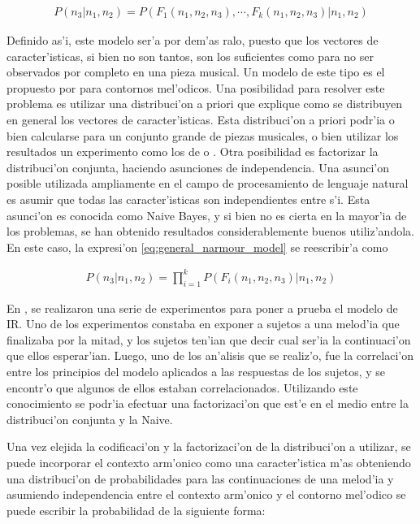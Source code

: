 \begin{align}
\label{eq:general_narmour_model}
P(n_3 | n_1, n_2) = P(F_1(n_1, n_2, n_3), \cdots, F_k(n_1, n_2, n_3)|n_1, n_2)
\end{align}

Definido as'i, este modelo ser'a por dem'as ralo, puesto que los vectores de caracter'isticas, si bien no son tantos, son los suficientes como para no ser observados
por completo en una pieza musical. Un modelo de este tipo es el propuesto por \cite{PaieThesis} para contornos mel'odicos. Una posibilidad para resolver este problema es utilizar una distribuci'on a priori que explique como se distribuyen en general
los vectores de caracter'isticas. Esta distribuci'on a priori podr'ia o bien calcularse para un conjunto grande de piezas musicales, o bien utilizar los resultados 
un experimento como los de \cite{Krumhansl95} o \cite{Schellenberg96}. 
Otra posibilidad es factorizar la distribuci'on conjunta, haciendo asunciones de independencia. Una asunci'on posible utilizada ampliamente en el campo 
de procesamiento de lenguaje natural es asumir que todas las caracter'isticas son independientes entre s'i. Esta asunci'on es conocida como Naive Bayes, y
si bien no es cierta en la mayor'ia de los problemas, se han obtenido resultados considerablemente buenos utiliz'andola. 
En este caso, la expresi'on \ref{eq:general_narmour_model} se reescribir'a como

\begin{align}
\label{eq:naive_bayes_narmour_model}
P(n_3 | n_1, n_2) = \prod_{i=1}^k P(F_i(n_1, n_2, n_3)|n_1, n_2)
\end{align}

En \cite{Schellenberg96}, se realizaron una serie de experimentos para poner a prueba el modelo de IR. Uno de los experimentos constaba en exponer a 
sujetos a una melod'ia que finalizaba por la mitad, y los sujetos ten'ian que decir cual ser'ia la continuaci'on que ellos esperar'ian. 
Luego, uno de los an'alisis que se realiz'o, fue la correlaci'on entre los principios del modelo aplicados a las respuestas de los sujetos, 
y se encontr'o que algunos de ellos estaban correlacionados. Utilizando este conocimiento se podr'ia efectuar una factorizaci'on que est'e en el medio entre 
la distribuci'on conjunta y la Naive.

Una vez elejida la codificaci'on y la factorizaci'on de la distribuci'on a utilizar, se puede incorporar el contexto arm'onico como una caracter'istica m'as 
obteniendo una distribuci'on de probabilidades para las continuaciones de una melod'ia y asumiendo independencia entre el contexto arm'onico y el contorno mel'odico
se puede escribir la probabilidad de la siguiente forma:

